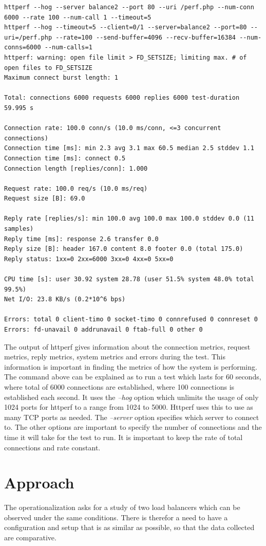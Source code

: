 \begin{lstlisting}[label=httperf, caption=Httperf output example,numbers=none]
httperf --hog --server balance2 --port 80 --uri /perf.php --num-conn 6000 --rate 100 --num-call 1 --timeout=5
httperf --hog --timeout=5 --client=0/1 --server=balance2 --port=80 --uri=/perf.php --rate=100 --send-buffer=4096 --recv-buffer=16384 --num-conns=6000 --num-calls=1
httperf: warning: open file limit > FD_SETSIZE; limiting max. # of open files to FD_SETSIZE
Maximum connect burst length: 1

Total: connections 6000 requests 6000 replies 6000 test-duration 59.995 s

Connection rate: 100.0 conn/s (10.0 ms/conn, <=3 concurrent connections)
Connection time [ms]: min 2.3 avg 3.1 max 60.5 median 2.5 stddev 1.1
Connection time [ms]: connect 0.5
Connection length [replies/conn]: 1.000

Request rate: 100.0 req/s (10.0 ms/req)
Request size [B]: 69.0

Reply rate [replies/s]: min 100.0 avg 100.0 max 100.0 stddev 0.0 (11 samples)
Reply time [ms]: response 2.6 transfer 0.0
Reply size [B]: header 167.0 content 8.0 footer 0.0 (total 175.0)
Reply status: 1xx=0 2xx=6000 3xx=0 4xx=0 5xx=0

CPU time [s]: user 30.92 system 28.78 (user 51.5% system 48.0% total 99.5%)
Net I/O: 23.8 KB/s (0.2*10^6 bps)

Errors: total 0 client-timo 0 socket-timo 0 connrefused 0 connreset 0
Errors: fd-unavail 0 addrunavail 0 ftab-full 0 other 0
\end{lstlisting}

The output of httperf gives information about the connection metrics, request
metrics, reply metrics, system metrics and errors during the test. This
information is important in finding the metrics of how the system is
performing. The command above can be explained as to run a test which lasts for
60 seconds, where total of 6000 connections are established, where 100
connections is established each second. It uses the \textit{--hog} option which
unlimits the usage of only 1024 ports for httperf to a range from 1024 to 5000.
Httperf uses this to use as many TCP ports as needed. The \textit{--server}
option specifies which server to connect to. The other options are important to
specify the number of connections and the time it will take for the test to
run. It is important to keep the rate of total connections and rate constant.

\section{Approach}
The operationalization asks for a study of two load balancers which can be
observed under the same conditions. There is therefor a need to have a
configuration and setup that is as similar as possible, so that the data
collected are comparative.

